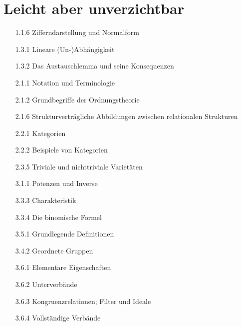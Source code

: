 \section{Leicht aber unverzichtbar}

\begin{itemize}

  \item
  [1.1.6]
  Zifferndarstellung und Normalform

  \item
  [1.3.1]
  Lineare (Un-)Abhängigkeit

  \item
  [1.3.2]
  Das Austauschlemma und seine Konsequenzen

  \item
  [2.1.1]
  Notation und Terminologie

  \item
  [2.1.2]
  Grundbegriffe der Ordnungstheorie

  \item
  [2.1.6]
  Strukturverträgliche Abbildungen zwischen relationalen Strukturen

  \item
  [2.2.1]
  Kategorien

  \item
  [2.2.2]
  Beispiele von Kategorien

  \item
  [2.3.5]
  Triviale und nichttriviale Varietäten

  \item
  [3.1.1]
  Potenzen und Inverse

  \item
  [3.3.3]
  Charakteristik

  \item
  [3.3.4]
  Die binomische Formel

  \item
  [3.5.1]
  Grundlegende Definitionen

  \item
  [3.4.2]
  Geordnete Gruppen

  \item
  [3.6.1]
  Elementare Eigenschaften

  \item
  [3.6.2]
  Unterverbände

  \item
  [3.6.3]
  Kongruenzrelationen; Filter und Ideale

  \item
  [3.6.4]
  Vollständige Verbände


\end{itemize}
